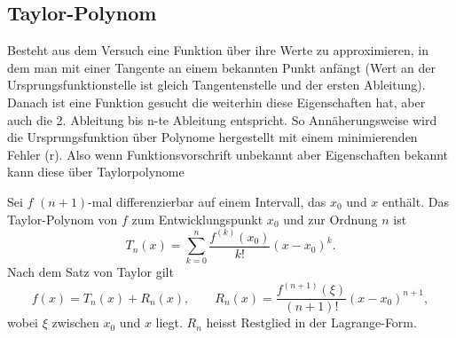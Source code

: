 \subsection{Taylor-Polynom}
Besteht aus dem Versuch eine Funktion über ihre Werte zu
approximieren, in dem man mit einer Tangente an einem bekannten
Punkt anfängt (Wert an der Ursprungsfunktionstelle ist gleich
Tangentenstelle und der ersten Ableitung). Danach ist eine
Funktion gesucht die weiterhin diese Eigenschaften hat, aber
auch die 2. Ableitung bis n-te Ableitung entspricht. So
Annäherungsweise wird die Ursprungsfunktion über Polynome
hergestellt mit einem minimierenden Fehler (r). Also wenn
Funktionsvorschrift unbekannt aber Eigenschaften bekannt kann
diese über Taylorpolynome 

\begin{definition}
     Sei $f$ $(n+1)$-mal
    differenzierbar auf einem Intervall, das $x_0$ und $x$ enthält.
    Das Taylor-Polynom von $f$ zum Entwicklungspunkt $x_0$ und zur
    Ordnung $n$ ist
    \[
        T_n(x) = \sum_{k=0}^{n} \frac{f^{(k)}(x_0)}{k!}(x-x_0)^k.
    \]
    Nach dem Satz von Taylor gilt
    \[
        f(x) = T_n(x) + R_n(x), \qquad
        R_n(x) = \frac{f^{(n+1)}(\xi)}{(n+1)!}(x-x_0)^{n+1},
    \]
    wobei $\xi$ zwischen $x_0$ und $x$ liegt. $R_n$ heisst
    Restglied in der Lagrange-Form.
\end{definition}
 